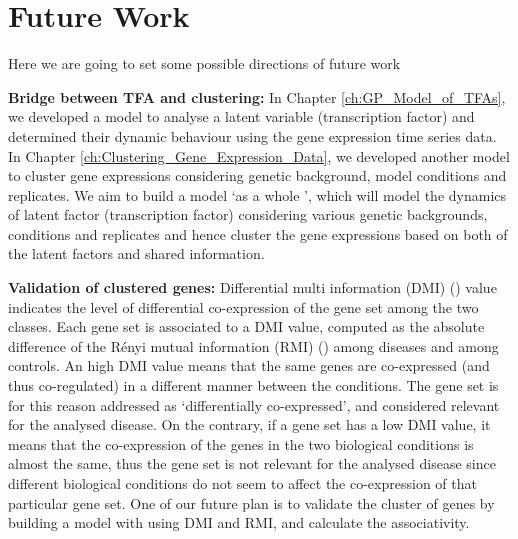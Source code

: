 
\section{Future Work}
Here we are going to set some possible directions of future work

\textbf{Bridge between TFA and clustering:} In Chapter \ref{ch:GP_Model_of_TFAs}, we developed a model to analyse a latent variable (transcription factor) and determined their dynamic behaviour using the gene expression time series data. In Chapter  \ref{ch:Clustering_Gene_Expression_Data}, we developed another model to cluster  gene expressions considering genetic background, model conditions and replicates. We aim to build a model \lq as a whole \rq, which will model the dynamics of latent factor (transcription factor) considering various genetic backgrounds, conditions and replicates and hence cluster the gene expressions based on both of the latent factors and shared information.

\textbf{Validation of clustered genes:} Differential multi information (DMI) (\cite{Gambardella:2015}) value indicates the level of differential co-expression of the gene set among the two classes. Each gene set is associated to a DMI value, computed as the absolute difference of the R{\'e}nyi mutual information (RMI) (\cite{Renyi:1960}) among diseases and among controls. An high DMI value means that the same genes are co-expressed (and thus co-regulated) in a different manner between the conditions. The gene set is for this reason addressed as \lq differentially co-expressed\rq, and considered relevant for the analysed disease. On the contrary, if a gene set has a low DMI value, it means that the co-expression of the genes in the two biological conditions is almost the same, thus the gene set is not relevant for the analysed disease since different biological conditions do not seem to affect the co-expression of that particular gene set. One of our future plan is to validate the cluster of genes by building a model with using DMI and RMI, and calculate the associativity.


